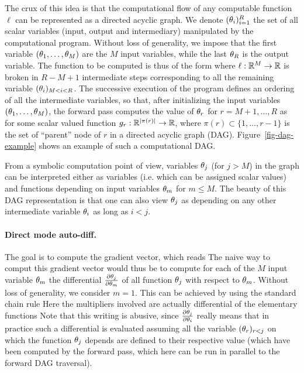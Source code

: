The crux of this idea is that the computational flow of any computable function $\ell$ can be represented as a directed acyclic graph. 
%
We denote $(\theta_i)_{i=1}^R$ the set of all scalar variables (input, output and intermediary) manipulated by the computational program.
%
Without loss of generality, we impose that the first variable $(\theta_1,\ldots,\theta_M)$ are the $M$ input variables, while the last $\theta_R$ is the output variable. The function to be computed is thus of the form 
where $\ell : \mathbb{R}^M \rightarrow \mathbb{R}$ is broken in $R-M+1$ intermediate steps corresponding to all the remaining variable $(\theta_i)_{M < i < R}$. 
%
The successive execution of the program defines an ordering of all the intermediate variables, so that, after initializing the input variables $(\theta_1,\ldots,\theta_M)$, the forward pass computes the value of $\theta_r$ for $r=M+1,\ldots,R$ as
for some scalar valued function $g_r : \mathbb{R}^{|\pi(r)|} \rightarrow \mathbb{R}$, where $\pi(r) \subset \{1,\ldots,r-1\}$ is the set of ``parent'' node of $r$ in a directed acyclic graph (DAG).  Figure~\ref{fig-dag-example} shows an example of such a computational DAG.


From a symbolic computation point of view, variables $\theta_j$ (for $j>M$) in the graph can be interpreted either as variables (i.e. which can be assigned scalar values) and functions depending on input variables $\theta_m$ for $m \leq M$. 
% 
The beauty of this DAG representation is that one can also view $\theta_j$ as depending on any other intermediate variable $\theta_i$ as long as $i<j$. 

\paragraph{Direct mode auto-diff.}

The goal is to compute the gradient vector, which reads
The naive way to comput this gradient vector would thus be to compute for each of the $M$ input variable $\theta_m$ the differential $\frac{ \partial \theta_j}{\partial \theta_m}$ of all function $\theta_j$ with respect to $\theta_m$. Without loss of generality, we consider $m=1$. This can be achieved by using the standard chain rule
Here the multipliers involved are actually differential of the elementary functions
Note that this writing is abusive, since $\frac{ \partial \theta_j}{\partial \theta_i}$ really means that in practice such a differential is evaluated assuming all the variable $(\theta_r)_{r<j}$ on which the function  $\theta_j$ depends are defined to their respective value (which have been computed by the forward pass, which here can be run in parallel to the forward DAG traversal).

